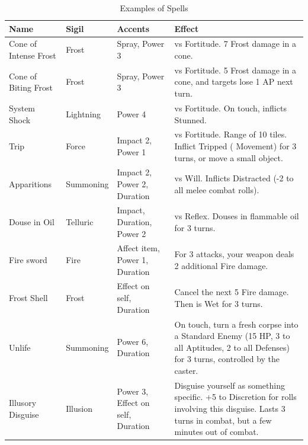 \begin{table}[h!tbp]
	\begin{center}
		\begin{tabular}{p{3cm}p{2cm}p{4cm}p{7.5cm}} \toprule
			
		    \textbf{Name} & \textbf{Sigil} & \textbf{Accents} & \textbf{Effect} \\ \midrule

		    Cone of Intense Frost & Frost & Spray, Power 3 & vs Fortitude. 7 Frost damage in a cone. \\[2mm] 
            Cone of Biting Frost & Frost & Spray, Power 3 & vs Fortitude. 5 Frost damage in a cone, and targets lose 1 AP next turn. \\[2mm] 

            System Shock & Lightning & Power 4 & vs Fortitude. On touch, inflicts Stunned. \\[2mm] 

            Trip & Force & Impact 2, Power 1 & vs Fortitude. Range of 10 tiles. Inflict Tripped (\times 0.5 Movement) for 3 turns, or move a small object. \\[2mm] 

            Apparitions & Summoning & Impact 2, Power 2, Duration & vs Will. Inflicts Distracted (-2 to all melee combat rolls). \\[2mm] 

            Douse in Oil & Telluric & Impact, Duration, Power 2 & vs Reflex. Douses in flammable oil for 3 turns.  \\[2mm] 

            Fire sword	& Fire	& Affect item, Power 1, Duration & For 3 attacks, your weapon deals 2 additional Fire damage. \\[2mm] 

            Frost Shell & Frost & Effect on self, Duration & Cancel the next 5 Fire damage. Then is Wet for 3 turns. \\[2mm] 

            Unlife  & Summoning & Power 6, Duration & On touch, turn a fresh corpse into a Standard Enemy (15 HP, 3 to all Aptitudes, 2 to all Defenses) for 3 turns, controlled by the caster. \\[2mm]

            Illusory Disguise & Illusion & Power 3, Effect on self, Duration & Disguise yourself as something specific. +5 to Discretion for rolls involving this disguise. Lasts 3 turns in combat, but a few minutes out of combat. \\[2mm] 

		    \bottomrule
		\end{tabular}
	\end{center}
	\caption{Examples of Spells}
  \label{spells_example_table}
\end{table}



